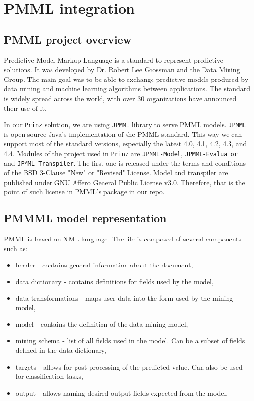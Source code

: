 \chapter{PMML integration}
\label{chap:pmml}

\section{PMML project overview}

Predictive Model Markup Language is a standard to represent predictive solutions.
It was developed by Dr. Robert Lee Grossman and the Data Mining Group.
The main goal was to be able to exchange predictive models produced by data mining
and machine learning algorithms between applications. The standard is widely spread across the world,
with over 30 organizations have announced their use of it.\cite{dmgpage}\cite{pmmlpowered}

In our \texttt{Prinz} solution, we are using \texttt{JPMML} library to serve PMML models. \texttt{JPMML} is open-source Java's
implementation of the PMML standard. This way we can support most of the standard versions, especially the latest
4.0, 4.1, 4.2, 4.3, and 4.4. Modules of the project used in \texttt{Prinz} are \texttt{JPMML-Model},
\texttt{JPMML-Evaluator} and \texttt{JPMML-Transpiler}. The first one is released under the terms and conditions
of the BSD 3-Clause "New" or "Revised" License. Model and transpiler are published under GNU Affero General Public License v3.0.
Therefore, that is the point of such license in PMML's package in our repo.\cite{jpmml}


\section{PMMML model representation}

PMML is based on XML language. The file is composed of several components such as:
\begin{itemize}
    \item header - contains general information about the document,
    \item data dictionary - contains definitions for fields used by the model,
    \item data transformations - maps user data into the form used by the mining model,
    \item model - contains the definition of the data mining model,
    \item mining schema - list of all fields used in the model. Can be a subset of fields defined in the data dictionary,
    \item targets - allows for post-processing of the predicted value. Can also be used for classification tasks,
    \item output - allows naming desired output fields expected from the model.
\end{itemize}


